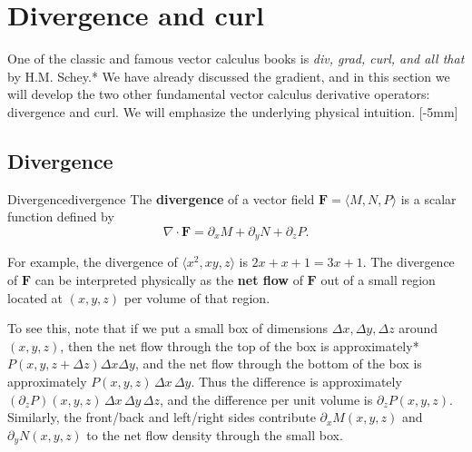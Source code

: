 \documentclass{watsonbook}
\begin{document}
\section{Divergence and curl} \label{sec:divcurl} 

One of the classic and famous vector calculus books is \textit{div,
  grad, curl, and all that} by H.M. Schey.* We have already discussed the gradient,
and in this section we will develop the two other fundamental vector
calculus derivative operators: divergence and curl. We will
emphasize the underlying physical intuition. [-5mm]

\subsection{Divergence}


\begin{defn}{Divergence}{divergence}
  The \textbf{divergence} of a vector field $\mathbf{F} = \langle M, N, P \rangle$ is a scalar function defined by
\[
  \nabla \cdot \mathbf{F} = \partial_x M  +\partial _y N + \partial_z
  P. 
\]
\end{defn}

For example, the divergence of $\langle x^2, xy, z \rangle$ is
$2x + x + 1 = 3x + 1$. The divergence of $\mathbf{F}$ can be
interpreted physically as the \textbf{net flow} of $\mathbf{F}$ out of
a small region located at $(x,y,z)$ per volume of that region. 

To see this, note that if we put a small box of dimensions $\Delta x, \Delta y, \Delta z$
around $(x,y,z)$, then the net flow through the top of the box is
approximately* $P(x,y,z+\Delta z)\Delta x \Delta y$, and the net flow
through the bottom of the box is approximately
$P(x, y, z)\, \Delta x \,\Delta y$. Thus the difference is approximately
$(\partial_z P)(x,y,z) \, \Delta x \,  \Delta y \, \Delta z$, and the
difference per unit volume is $\partial_z P(x,y,z)$. Similarly, the front/back
and left/right sides contribute $\partial_x M(x,y,z)$ and $\partial_y N(x,y,z)$ to
the net flow density through the small box.
\end{document}
